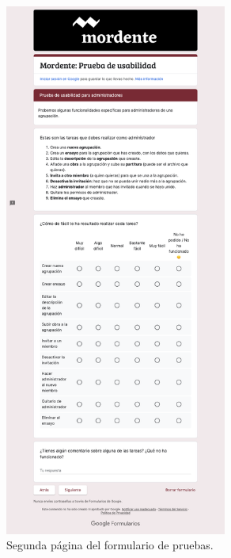 \begin{figure}[h]
\centering
\includegraphics[width=0.65\textwidth]{imagenes/pruebas/form_2.png}
\caption{Segunda página del formulario de pruebas.}
\label{fig:form2}
\end{figure}

